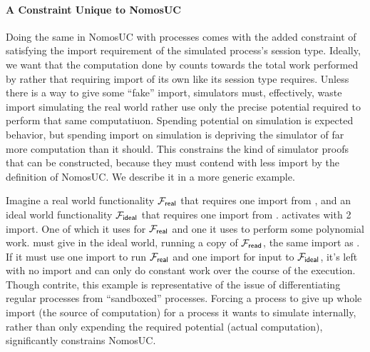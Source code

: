 \paragraph*{\textbf{A Constraint Unique to NomosUC}}
Doing the same in NomosUC with processes comes with the added constraint of satisfying the import requirement of the simulated process's session type.
Ideally, we want that the computation done by \Fro counts towards the total work performed by \Sim rather that requiring import of its own like its session type requires.
Unless there is a way to give \Fro some ``fake'' import, simulators must, effectively, waste import simulating the real world rather use only the precise potential required to perform that same computatiuon.
Spending potential on simulation is expected behavior, but spending import on simulation is depriving the simulator of far more computation than it should.
This constrains the kind of simulator proofs that can be constructed, because they must contend with less import by the definition of NomosUC.
We describe it in a more generic example.

Imagine a real world functionality $\mathcal{F}_{\mathsf{real}}$ that requires one import from \A, and an ideal world functionality $\mathcal{F}_{\mathsf{ideal}}$ that requires one import from \Sim.
\Z activates \A with 2 import. One of which it uses for $\mathcal{F}_{\mathsf{real}}$ and one it uses to perform some polynomial work.
\Z must give \Sim in the ideal world, running a copy of $\mathcal{F}_{\mathsf{read}}$, the same import as \A.
If it must use one import to run $\mathcal{F}_{\mathsf{real}}$ and one import for input to $\mathcal{F}_{\mathsf{ideal}}$, it's left with no import and can only do constant work over the course of the execution.
Though contrite, this example is representative of the issue of differentiating regular processes from ``sandboxed'' processes.
Forcing a process to give up whole import (the source of computation) for a process it wants to simulate internally, rather than only expending the required potential (actual computation), significantly constrains NomosUC.

